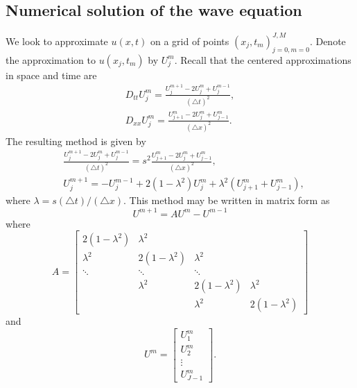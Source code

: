 

\subsection{Numerical solution of the wave equation}
We look to approximate $u(x,t)$ on a grid of points $(x_j,t_m)_{j=0,m=0}^{J,M}$.
Denote the approximation to $u(x_j,t_m)$ by $U_{j}^{m}$.
Recall that the centered approximations in space and time are
\begin{align*}
D_{tt} U_{j}^{m} = \frac{U_{j}^{m+1} -2 U_{j}^{m} + U_{j}^{m-1}}{(\triangle t)^2} ,\\
D_{xx} U_{j}^{m} = \frac{U_{j+1}^{m} -2 U_{j}^{m} + U_{j-1}^{m}}{(\triangle x)^2} .
\end{align*}
% 
The resulting method is given by 
\begin{align*}
	&\frac{U_{j}^{m+1} -2 U_{j}^{m} + U_{j}^{m-1}}{(\triangle t)^2} = s^2 \frac{U_{j+1}^{m} -2 U_{j}^{m} + U_{j-1}^{m}}{(\triangle x)^2}, \\
	&U_{j}^{m+1} =  - U_{j}^{m-1} + 2 (1-\lambda^2) U_{j}^{m} + \lambda ^2 (U_{j+1}^{m} + U_{j-1}^{m}),
\end{align*}
where $ \lambda  =  s(\triangle t)/(\triangle x)$. This method may be written in matrix form as 
\[U^{m+1} = AU^{m} - U^{m-1} \]
where 
\[
A = 
\left[\begin{array}{cccc}2(1-\lambda^2) & \lambda^2 &  &  \\ \lambda^2 & 2(1-\lambda^2) & \lambda^2 &  \\ \ddots & \ddots & \ddots &  \\ & \lambda^2 & 2(1-\lambda^2) & \lambda^2 \\  &  & \lambda^2 & 2(1-\lambda^2)\end{array}\right]
\]
and
\[ U^m = 
\left[\begin{array}{c}U_{1}^{m} \\U_{2}^{m} \\\vdots \\U_{J-1}^{m}\end{array}\right].
\]



